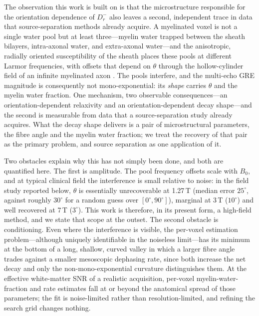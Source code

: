 \documentclass[AMA,STIX2COL,Linenumberson]{MRM}
\begin{document}
The observation this work is built on is that the microstructure responsible for the orientation dependence of $D_r^{-}$ also leaves a second, independent trace in data that source-separation methods already acquire. A myelinated voxel is not a single water pool but at least three---myelin water trapped between the sheath bilayers, intra-axonal water, and extra-axonal water---and the anisotropic, radially oriented susceptibility of the sheath places these pools at different Larmor frequencies, with offsets that depend on $\theta$ through the hollow-cylinder field of an infinite myelinated axon \cite{wharton_fiber_2012,wharton_gradient_2013,sukstanskii_role_2014}. The pools interfere, and the multi-echo GRE magnitude is consequently not mono-exponential: its \emph{shape} carries $\theta$ and the myelin water fraction. One mechanism, two observable consequences---an orientation-dependent relaxivity and an orientation-dependent decay shape---and the second is measurable from data that a source-separation study already acquires. What the decay shape delivers is a pair of microstructural parameters, the fibre angle and the myelin water fraction; we treat the recovery of that pair as the primary problem, and source separation as one application of it.

Two obstacles explain why this has not simply been done, and both are quantified here. The first is amplitude. The pool frequency offsets scale with $B_0$, and at typical clinical field the interference is small relative to noise: in the field study reported below, $\theta$ is essentially unrecoverable at 1.27\,T (median error $25^\circ$, against roughly $30^\circ$ for a random guess over $[0^\circ,90^\circ]$), marginal at 3\,T ($10^\circ$) and well recovered at 7\,T ($3^\circ$). This work is therefore, in its present form, a high-field method, and we state that scope at the outset. The second obstacle is conditioning. Even where the interference is visible, the per-voxel estimation problem---although uniquely identifiable in the noiseless limit---has its minimum at the bottom of a long, shallow, curved valley in which a larger fibre angle trades against a smaller mesoscopic dephasing rate, since both increase the net decay and only the non-mono-exponential curvature distinguishes them. At the effective white-matter SNR of a realistic acquisition, per-voxel myelin-water-fraction and rate estimates fall at or beyond the anatomical spread of those parameters; the fit is noise-limited rather than resolution-limited, and refining the search grid changes nothing.
\end{document}
